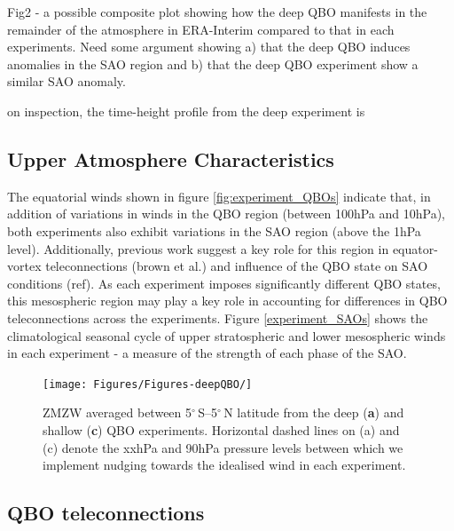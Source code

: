 Fig2 - a possible composite plot showing how the deep QBO manifests in the remainder of the atmosphere in ERA-Interim compared to that in each experiments. Need some argument showing a) that the deep QBO induces anomalies in the SAO region and b) that the deep QBO experiment show a similar SAO anomaly. 

on inspection, the time-height profile from the deep experiment is 

\subsection{Upper Atmosphere Characteristics}

The equatorial winds shown in figure \ref{fig:experiment_QBOs} indicate that, in addition of variations in winds in the QBO region (between 100hPa and 10hPa), both experiments also exhibit variations in the SAO region (above the 1hPa level). Additionally, previous work suggest a key role for this region in equator-vortex teleconnections (brown et al.) and influence of the QBO state on SAO conditions (ref). As each experiment imposes significantly different QBO states, this mesospheric region may play a key role in accounting for differences in QBO teleconnections across the experiments. Figure \ref{experiment_SAOs} shows the climatological seasonal cycle of upper stratospheric and lower mesospheric winds in each experiment - a measure of the strength of each phase of the SAO. 

\begin{figure}[h!]
\begin{center}
\noindent\texttt{[image: Figures/Figures-deepQBO/]}
\caption[Equatorial ZMZW time-height profiles from QBO nudging experiments]{ZMZW averaged between 5$^{\circ}$\,S--5$^{\circ}$\,N latitude from the deep (\textbf{a}) and shallow (\textbf{c}) QBO experiments. Horizontal dashed lines on (a) and (c) denote the xxhPa and 90hPa pressure levels between which we implement nudging towards the idealised wind in each experiment.}
\label{fig:experiment_SAOs}
\end{center}
\end{figure}


\subsection{QBO teleconnections}



